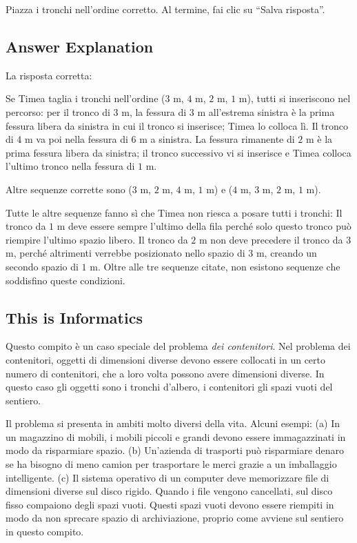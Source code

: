 \documentclass[a4paper,11pt]{report}
\newcommand{\taskGraphicsFolder}{..}
\begin{document}
Piazza i tronchi nell’ordine corretto. Al termine, fai clic su \enquote{Salva risposta}.


\subsection*{Answer Explanation}

La risposta corretta:

{\centering%
\par}

Se Timea taglia i tronchi nell’ordine ($3$ m, $4$ m, $2$ m, $1$ m), tutti si inseriscono nel percorso: per il tronco di $3$ m, la fessura di $3$ m all’estrema sinistra è la prima fessura libera da sinistra in cui il tronco si inserisce; Timea lo colloca lì. Il tronco di $4$ m va poi nella fessura di $6$ m a sinistra. La fessura rimanente di $2$ m è la prima fessura libera da sinistra; il tronco successivo vi si inserisce e Timea colloca l’ultimo tronco nella fessura di $1$ m.

Altre sequenze corrette sono ($3$ m, $2$ m, $4$ m, $1$ m) e ($4$ m, $3$ m, $2$ m, $1$ m).

Tutte le altre sequenze fanno sì che Timea non riesca a posare tutti i tronchi: Il tronco da $1$ m deve essere sempre l’ultimo della fila perché solo questo tronco può riempire l’ultimo spazio libero. Il tronco da $2$ m non deve precedere il tronco da $3$ m, perché altrimenti verrebbe posizionato nello spazio di $3$ m, creando un secondo spazio di $1$ m. Oltre alle tre sequenze citate, non esistono sequenze che soddisfino queste condizioni.


\subsection*{This is Informatics}

Questo compito è un caso speciale del problema \emph{dei contenitori}. Nel problema dei contenitori, oggetti di dimensioni diverse devono essere collocati in un certo numero di contenitori, che a loro volta possono avere dimensioni diverse. In questo caso gli oggetti sono i tronchi d’albero, i contenitori gli spazi vuoti del sentiero.

Il problema si presenta in ambiti molto diversi della vita. Alcuni esempi: (a) In un magazzino di mobili, i mobili piccoli e grandi devono essere immagazzinati in modo da risparmiare spazio. (b) Un’azienda di trasporti può risparmiare denaro se ha bisogno di meno camion per trasportare le merci grazie a un imballaggio intelligente. (c) Il sistema operativo di un computer deve memorizzare file di dimensioni diverse sul disco rigido. Quando i file vengono cancellati, sul disco fisso compaiono degli spazi vuoti. Questi spazi vuoti devono essere riempiti in modo da non sprecare spazio di archiviazione, proprio come avviene sul sentiero in questo compito.
\end{document}

